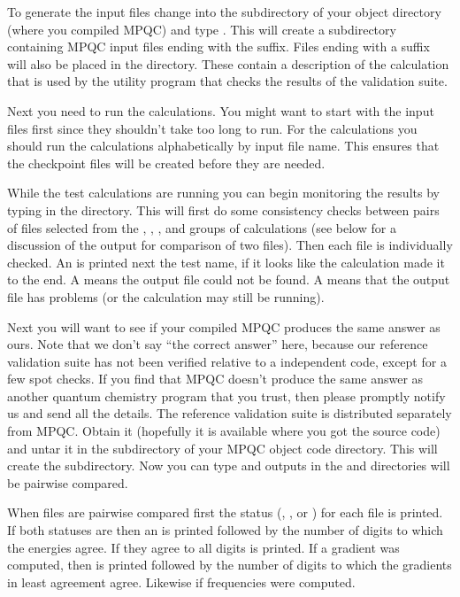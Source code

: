   To generate the input files change into the 
subdirectory of your object directory (where you compiled MPQC) and type
.  This will create a  subdirectory containing
MPQC input files ending with the  suffix.  Files ending with a
 suffix will also be placed in the  directory.
These contain a description of the calculation that is used by the utility
program that checks the results of the validation suite.

  Next you need to run the calculations.  You might want to start with the
 input files first since they shouldn't take too long to run.
For the  calculations you should run the calculations
alphabetically by input file name.  This ensures that the checkpoint files
will be created before they are needed.

  While the test calculations are running you can begin monitoring the
results by typing  in the 
directory.  This will first do some consistency checks between pairs of
files selected from the , , , and
 groups of calculations (see below for a discussion of the
output for comparison of two files).  Then each file is individually
checked.  An  is printed next the test name, if it looks like the
calculation made it to the end.  A  means the output file
could not be found.  A  means that the output file has
problems (or the calculation may still be running).

  Next you will want to see if your compiled MPQC produces the same answer
as ours.  Note that we don't say ``the correct answer'' here, because our
reference validation suite has not been verified relative to a independent
code, except for a few spot checks.  If you find that MPQC doesn't produce
the same answer as another quantum chemistry program that you trust, then
please promptly notify us and send all the details.  The reference
validation suite is distributed separately from MPQC.  Obtain it (hopefully
it is available where you got the source code) and untar it in the
 subdirectory of your MPQC object code
directory.  This will create the  subdirectory.  Now you can
type  and outputs in the  and 
directories will be pairwise compared.

  When files are pairwise compared first the status (,
, or ) for each file is printed.  If both
statuses are  then an  is printed followed by the number
of digits to which the energies agree.  If they agree to all digits
 is printed.  If a gradient was computed, then  is
printed followed by the number of digits to which the gradients in least
agreement agree.  Likewise if frequencies were computed.

